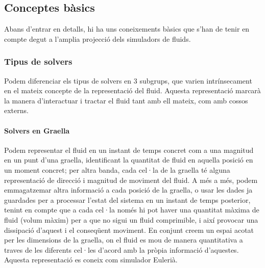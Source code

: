 \documentclass[a4paper]{report}
\begin{document}
	\subsection{Conceptes bàsics}
	Abans d'entrar en detalls, hi ha uns coneixements bàsics que s'han de tenir en compte degut a l'amplia projecció dels simuladors de fluids.
	\subsubsection[Tipus de solvers]{Tipus de solvers} 
	Podem diferenciar els tipus de solvers en 3 subgrups, que varien intrínsecament en el mateix concepte de la representació del fluid. Aquesta representació marcarà la manera d'interactuar i tractar el fluid tant amb ell mateix, com amb cossos externs.
	
	\paragraph[Graella]{Solvers en Graella} Podem representar el fluid en un instant de temps concret com a una magnitud en un punt d'una graella, identificant la quantitat de fluid en aquella posició en un moment concret; per altra banda, cada cel·la de la graella té alguna representació de direcció i magnitud de moviment del fluid. \newline
	A més a més, podem emmagatzemar altra informació a cada posició de la graella, o usar les dades ja guardades per a processar l'estat del sistema en un instant de temps posterior, tenint en compte que a cada cel·la només hi pot haver una quantitat màxima de fluid (volum màxim) per a que no sigui un fluid comprimible, i així provocar una dissipació d'aquest i el conseqüent moviment.\newline
	En conjunt creem un espai acotat per les dimensions de la graella, on el fluid es mou de manera quantitativa a traves de les diferents cel·les d'acord amb la pròpia informació d'aquestes. \newline
	Aquesta representació es coneix com simulador Eulerià.
\end{document}
